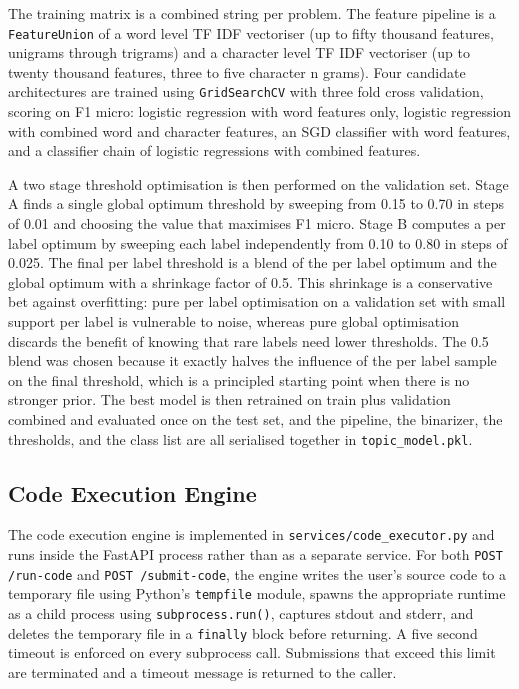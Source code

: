 The training matrix is a combined  string per problem. The feature pipeline is a
\texttt{FeatureUnion} of a word level TF IDF vectoriser (up to fifty
thousand features, unigrams through trigrams) and a character level
TF IDF vectoriser (up to twenty thousand features, three to five
character n grams). Four candidate architectures are trained using
\texttt{GridSearchCV} with three fold cross validation, scoring on F1
micro: logistic regression with word features only, logistic regression
with combined word and character features, an SGD classifier with word
features, and a classifier chain \cite{read2011classifierchains} of
logistic regressions with combined features.

A two stage threshold optimisation is then performed on the validation
set. Stage A finds a single global optimum threshold by sweeping from
0.15 to 0.70 in steps of 0.01 and choosing the value that maximises F1
micro. Stage B computes a per label optimum by sweeping each label
independently from 0.10 to 0.80 in steps of 0.025. The final per label
threshold is a blend of the per label optimum and the global optimum
with a shrinkage factor of 0.5. This shrinkage is a conservative bet
against overfitting: pure per label optimisation on a validation set
with small support per label is vulnerable to noise, whereas pure
global optimisation discards the benefit of knowing that rare labels
need lower thresholds. The 0.5 blend was chosen because it exactly
halves the influence of the per label sample on the final threshold,
which is a principled starting point when there is no stronger prior.
The best model is then retrained on train plus validation combined and
evaluated once on the test set, and the pipeline, the binarizer, the
thresholds, and the class list are all serialised together in
\texttt{topic\_model.pkl}.

\subsection{Code Execution Engine}

The code execution engine is implemented in
\texttt{services/code\_executor.py} and runs inside the FastAPI process
rather than as a separate service. For both \texttt{POST /run-code} and
\texttt{POST /submit-code}, the engine writes the user's source code to
a temporary file using Python's \texttt{tempfile} module, spawns the
appropriate runtime as a child process using \texttt{subprocess.run()},
captures stdout and stderr, and deletes the temporary file in a
\texttt{finally} block before returning. A five second timeout is
enforced on every subprocess call. Submissions that exceed this limit
are terminated and a timeout message is returned to the caller.

